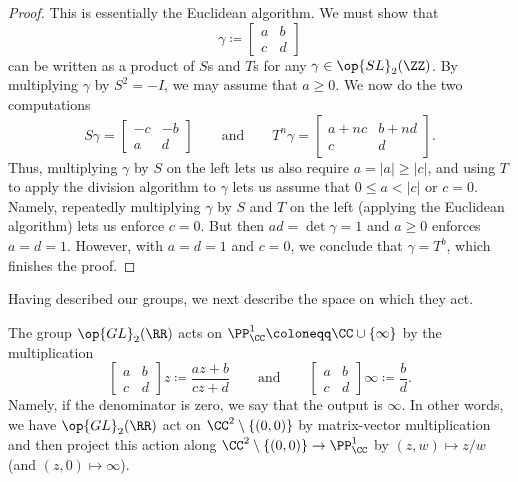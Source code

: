 \documentclass{amsart}
\begin{document}
\begin{proof}
	This is essentially the Euclidean algorithm. We must show that
	\[\gamma\coloneqq\begin{bmatrix}
		a & b \\
		c & d
	\end{bmatrix}\]
	can be written as a product of $S$s and $T$s for any $\gamma\in\op{SL}_2(\ZZ)$. By multiplying $\gamma$ by $S^2=-I$, we may assume that $a\ge0$. We now do the two computations
	\[S\gamma=\begin{bmatrix}
		-c & -b \\
		a & d
	\end{bmatrix}\qquad\text{and}\qquad T^n\gamma=\begin{bmatrix}
		a+nc & b+nd \\
		c & d
	\end{bmatrix}.\]
	Thus, multiplying $\gamma$ by $S$ on the left lets us also require $a=|a|\ge|c|$, and using $T$ to apply the division algorithm to $\gamma$ lets us assume that $0\le a<|c|$ or $c=0$. Namely, repeatedly multiplying $\gamma$ by $S$ and $T$ on the left (applying the Euclidean algorithm) lets us enforce $c=0$. But then $ad=\det\gamma=1$ and $a\ge0$ enforces $a=d=1$. However, with $a=d=1$ and $c=0$, we conclude that $\gamma=T^b$, which finishes the proof.
\end{proof}

Having described our groups, we next describe the space on which they act.
\begin{definition}
	The group $\op{GL}_2(\RR)$ acts on $\PP^1_\CC\coloneqq\CC\cup\{\infty\}$ by the multiplication
	\[\begin{bmatrix}
		a & b \\
		c & d
	\end{bmatrix}z\coloneqq\frac{az+b}{cz+d}\qquad\text{and}\qquad\begin{bmatrix}
		a & b \\
		c & d
	\end{bmatrix}\infty\coloneqq\frac bd.\]
	Namely, if the denominator is zero, we say that the output is $\infty$. In other words, we have $\op{GL}_2(\RR)$ act on $\CC^2\setminus\{(0,0)\}$ by matrix-vector multiplication and then project this action along $\CC^2\setminus\{(0,0)\}\to\PP^1_\CC$ by $(z,w)\mapsto z/w$ (and $(z,0)\mapsto\infty$).
\end{definition}
\end{document}
